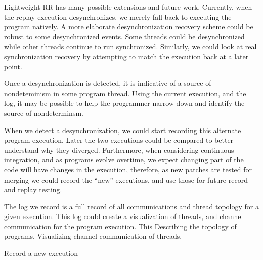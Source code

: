 \documentclass{article}
\begin{document}
Lightweight RR has many possible extensions and future work. Currently, when the replay
execution desynchronizes, we merely fall back to executing the program natively. A more
elaborate desynchronization recovery scheme could be robust to some desynchronized
events. Some threads could be desynchronized while other threads continue to run
synchronized. Similarly, we could look at real synchronization recovery by attempting
to match the execution back at a later point.

Once a desynchronization is detected, it is indicative of a source of nondeteminism
in some program thread. Using the current execution, and the log, it may be possible
to help the programmer narrow down and identify the source of nondeterminsm.

When we detect a desynchronization, we could start recording this alternate program
execution. Later the two executions could be compared to better understand why
they diverged. Furthermore, when considering continuous integration, and as programs
evolve overtime, we expect changing part of the code will have changes in the execution,
therefore, as new patches are tested for merging we could record the ``new'' executions,
and use those for future record and replay testing.

The log we record is a full record of all communications and thread topology for a
given execution. This log could create a visualization of threads, and channel
communication for the program execution. This
Describing the topology of programs.
Visualizing channel communication of threads.

Record a new execution
\end{document}
